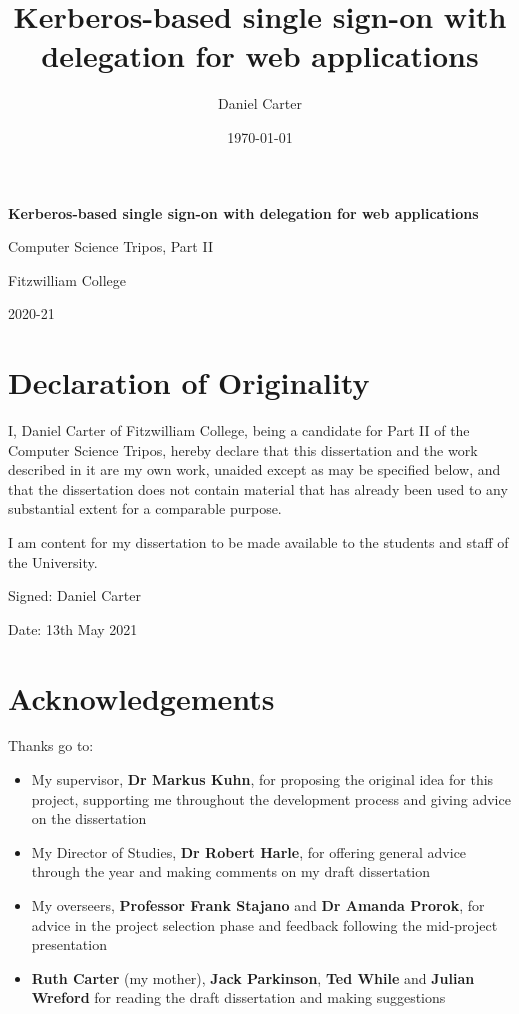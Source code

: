 \documentclass[12pt]{report}
\title{Kerberos-based single sign-on with delegation for web applications}
\author{Daniel Carter}
\date {\today}
\begin{document}

\begin{titlepage}
  \vfill
  \begin{center}
    \huge{
      \textbf{Kerberos-based single sign-on with delegation for web applications}

     Computer Science Tripos, Part II

     Fitzwilliam College

     2020-21
    }
  \end{center}
  \vfill
\end{titlepage}

\section*{Declaration of Originality}
I, Daniel Carter of Fitzwilliam College, being a candidate for Part II of the Computer Science Tripos, hereby declare that this dissertation and the work described in it are my own work, unaided except as may be specified below, and that the dissertation does not contain material that has already been used to any substantial extent for a comparable purpose.

I am content for my dissertation to be made available to the students and staff of the University.

Signed: Daniel Carter

Date: 13th May 2021

\section*{Acknowledgements}
Thanks go to:
\begin{itemize}
\item
  My supervisor, \textbf{Dr Markus Kuhn}, for proposing the original idea for this project, supporting me throughout the development process and giving advice on the dissertation
\item
  My Director of Studies, \textbf{Dr Robert Harle}, for offering general advice through the year and making comments on my draft dissertation
\item
  My overseers, \textbf{Professor Frank Stajano} and \textbf{Dr Amanda Prorok}, for advice in the project selection phase and feedback following the mid-project presentation
\item
  \textbf{Ruth Carter} (my mother), \textbf{Jack Parkinson}, \textbf{Ted While} and \textbf{Julian Wreford} for reading the draft dissertation and making suggestions
\end{itemize}
\end{document}
